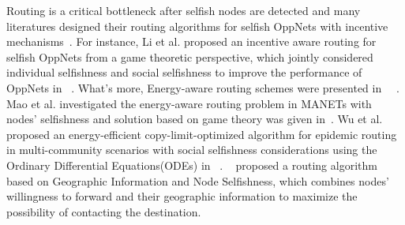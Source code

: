 Routing is a critical bottleneck after selfish nodes are detected and many literatures designed their routing algorithms for selfish OppNets with incentive mechanisms~\cite{DBLP:journals/access/WangWGFL18, DBLP:conf/ciss/ChhabraVS17, DBLP:journals/tpds/ChenSY15}.
For instance, Li et al. proposed an incentive aware routing for selfish OppNets from a game theoretic perspective, which jointly considered individual selfishness and social selfishness to improve the performance of OppNets in ~\cite{DBLP:conf/wcsp/LiQZC16}.
What's more, Energy-aware routing schemes were presented in ~\cite{DBLP:journals/monet/MaoZ15}~\cite{DBLP:conf/globecom/WuZLYP16}. Mao et al. investigated the energy-aware routing problem in MANETs with nodes' selfishness and solution based on game theory was given in~\cite{DBLP:journals/monet/MaoZ15}. Wu et al. proposed an energy-efficient copy-limit-optimized algorithm for epidemic routing in multi-community scenarios with social selfishness considerations using the Ordinary Differential Equations(ODEs) in ~\cite{DBLP:conf/globecom/WuZLYP16}. ~\cite{7914197} proposed a routing algorithm based on Geographic Information and Node Selfishness, which combines nodes' willingness to forward and their geographic information to maximize the possibility of contacting the destination.

